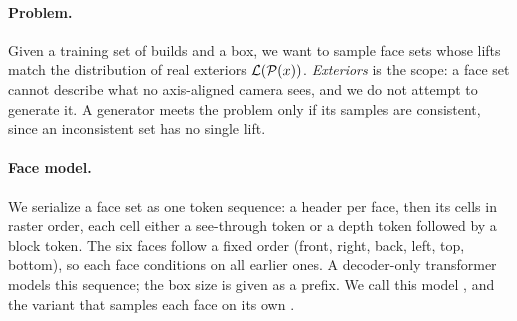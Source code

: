 \paragraph{Problem.}
Given a training set of builds and a box, we want to sample face sets whose lifts match the
distribution of real exteriors $\mathcal{L}(\mathcal{P}(x))$. \emph{Exteriors} is the scope: a face set cannot
describe what no axis-aligned camera sees, and we do not attempt to generate it. A generator meets the
problem only if its samples are consistent, since an inconsistent set has no single lift.

\paragraph{Face model.}
We serialize a face set as one token sequence: a header per face, then its cells in raster order, each
cell either a see-through token or a depth token followed by a block token. The six faces follow a
fixed order (front, right, back, left, top, bottom), so each face conditions on all earlier ones. A
decoder-only transformer~\citep{vaswani2017attention} models this sequence; the box size is given
as a prefix. We call this model \jointface{}, and the variant that samples each face on its own
\indepface{}.
